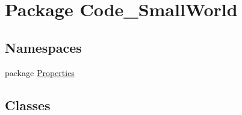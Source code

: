 \hypertarget{namespace_code___small_world}{\section{Package Code\-\_\-\-Small\-World}
\label{namespace_code___small_world}
}
\subsection*{Namespaces}
\begin{DoxyCompactItemize}
\item 
package \hyperlink{namespace_code___small_world_1_1_properties}{Properties}
\end{DoxyCompactItemize}
\subsection*{Classes}
